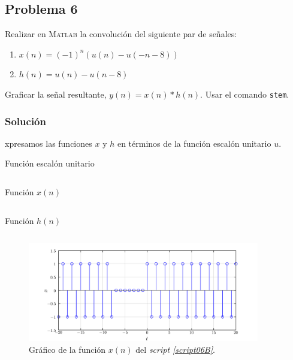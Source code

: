 \documentclass[a4paper,12pt,final]{article}
\begin{document}
  \newpage
  \subsection*{Problema 6}
    \noindent Realizar en \textsc{Matlab} la convolución del siguiente par de
    señales:

    \begin{enumerate}
        \item $x\left(n\right) = \left(-1\right)^n \left(u\left(n\right) - u\left(-n-8\right)\right)$
        \item $h\left(n\right) = u\left(n\right) - u\left(n-8\right)$
    \end{enumerate}

    \noindent Graficar la señal resultante, $y\left(n\right) = x\left(n\right) * h\left(n\right)$.
    Usar el comando \texttt{stem}.

    \subsubsection*{Solución}
      \noindent xpresamos las funciones $x$ y $h$ en términos de la función escalón unitario $u$.

      \begin{listing}[H]
        \caption{Función escalón unitario}
        \label{script06A}
        \inputminted{matlab}{./laboratorio_3/escalon.m}
      \end{listing}

      \begin{listing}[H]
        \caption{Función $x\left(n\right)$}
        \label{script06B}
        \inputminted{matlab}{./laboratorio_3/p6_X.m}
      \end{listing}

      \begin{listing}[H]
        \caption{Función $h\left(n\right)$}
        \label{script06C}
        \inputminted{matlab}{./laboratorio_3/p6_H.m}
      \end{listing}

    \begin{figure}[H]
      \begin{center}
        \caption{Gráfico de la función $x\left(n\right)$ del \emph{script \ref{script06B}}.}
        \includegraphics[width=0.90\textwidth]{./laboratorio_3/problema06_X.png}
      \end{center}
    \end{figure}
\end{document}
